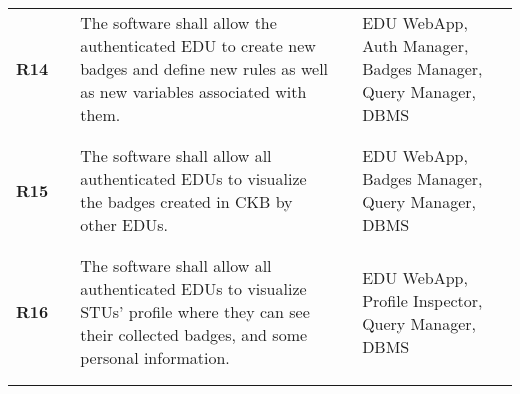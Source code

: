 \begin{longtable}[H]{l l p{6cm} l p{4cm}}
    \textbf{R14}            & \vline & The software shall allow the authenticated EDU to create new badges and define new rules as well as new variables associated with them.                                                                                                                                      & \vline &  EDU WebApp, Auth Manager, Badges Manager, Query Manager, DBMS                           \\          
                            &        &                                                                                                                                                                                                                                                                              &        &                                                                                          \\\hline & & \\ 
    \textbf{R15}            & \vline & The software shall allow all authenticated EDUs to visualize the badges created in CKB by other EDUs.                                                                                                                                                                        & \vline &  EDU WebApp, Badges Manager, Query Manager, DBMS                                         \\          
                            &        &                                                                                                                                                                                                                                                                              &        &                                                                                          \\\hline & & \\ 
    \textbf{R16}            & \vline & The software shall allow all authenticated EDUs to visualize STUs' profile where they can see their collected badges, and some personal information.                                                                                                                         & \vline &  EDU WebApp, Profile Inspector, Query Manager, DBMS                                      \\          
                            &        &                                                                                                                                                                                                                                                                              &        &                                                                                          \\\hline & & \\ 

\end{longtable}
